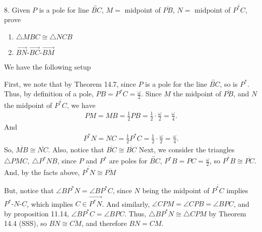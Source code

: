 \documentclass{report}
\begin{document}
    \pagebreak \bigbreak \noindent 
    \begin{mdframed}
        8. Given $P$ is a pole for line $\overleftrightarrow{BC}$, $M =$ midpoint of $\overline{PB}$, $N =$ midpoint of $\overline{P^{*}C}$, prove
        \begin{enumerate}[label=(\alph*)]
            \item $\triangle MBC  \cong \triangle NCB$
            \item $ \overrightarrow{BN}\text{-}\overrightarrow{BC}\text{-}\overrightarrow{BM} $
        \end{enumerate}
    \end{mdframed}
    \bigbreak \noindent 
    We have the following setup
    \bigbreak \noindent 
    \begin{figure}[ht]
        \centering
        \label{fig:tris}
    \end{figure}
    \bigbreak \noindent 
    First, we note that by Theorem 14.7, since $P$ is a pole for the line $\overleftrightarrow{BC}$, so is $P^{*}$. Thus, by definition of a pole, $PB = P^{*}C = \frac{\omega}{2}$.
    \bigbreak \noindent 
    Since $M$ the midpoint of $\overline{PB}$, and $N$ the midpoint of $\overline{P^{*}C}$, we have
    \begin{align*}
        PM = MB = \frac{1}{2}PB = \frac{1}{2} \cdot  \frac{\omega}{2} = \frac{\omega}{4} 
    .\end{align*}
    And 
    \begin{align*}
        P^{*}N = NC = \frac{1}{2}P^{*}C = \frac{1}{2} \cdot \frac{\omega}{2} = \frac{\omega}{4}
    .\end{align*}
    So, $\overline{MB} \cong \overline{NC}$. Also, notice that $ \overline{BC} \cong \overline{BC} $
    \bigbreak \noindent 
    Next, we consider the triangles $\triangle PMC,\ \triangle P^{*}NB$, since $P$ and $P^{*}$ are poles for $\overleftrightarrow{BC}$, $P^{*}B = PC = \frac{\omega}{2}$, so $\overline{P^{*}B} \cong \overline{PC}$. And, by the facts above, $\overline{P^{*}N} \cong \overline{PM}$
    \pagebreak \bigbreak \noindent 
    \begin{figure}[ht]
        \centering
        \label{fig:tris3}
    \end{figure}
    \bigbreak \noindent 
    But, notice that $\angle BP^{*}N = \angle BP^{*}C$, since $N$ being the midpoint of $\overline{P^{*}C}$ implies $ P^{*}\text{-}N\text{-}C$, which implies $C \in \overrightarrow{P^{*}N} $. And similarly, $\angle  CPM = \angle CPB = \angle BPC$, and by proposition 11.14, $\angle BP^{*}C = \angle BPC$. Thus, $ \triangle BP^{*}N \cong \triangle CPM$ by Theorem 14.4 (SSS), so $ \overline{BN} \cong \overline{CM}$, and therefore $ BN = CM$.
\end{document}
